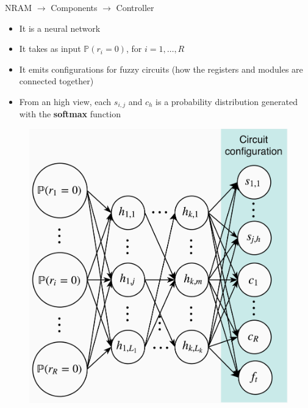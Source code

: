 \documentclass[xcolor={usenames}]{beamer}
\begin{document}
  \begin{frame}{NRAM \(\rightarrow\) Components \(\rightarrow\)  Controller}
  	\begin{minipage}{0.45\textwidth}
  		\begin{itemize}
  			\item{It is a neural network}
  			\item{It takes as input $\mathbb{P}(r_{i} = 0)$, for $i = 1, \dots, R$}
  			\item{It emits configurations for fuzzy circuits (how the registers and modules are connected together)}
  			\item{From an high view, each $s_{i,j}$ and $c_h$ is a probability distribution generated with the \textbf{softmax} function}
  		\end{itemize}
  	\end{minipage}
  	\hfill
  	\begin{minipage}{0.54\textwidth}
  		\begin{figure}
  			\centering
  			\includegraphics[width=\textwidth]{../figures/nram-mlp.png}
  		\end{figure}
  	\end{minipage}
  \end{frame}
  
\end{document}
